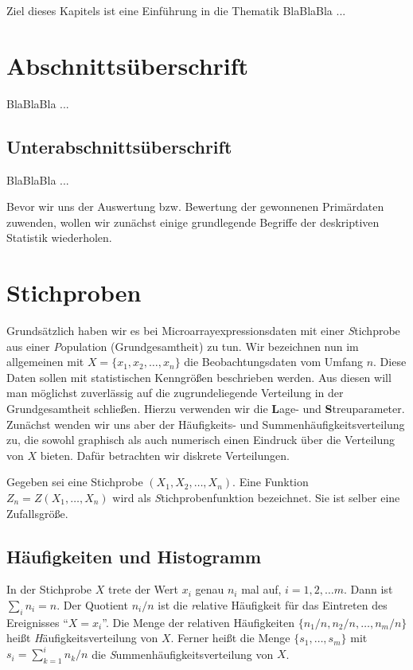
Ziel dieses Kapitels ist eine Einführung in die Thematik BlaBlaBla ...

\section{Abschnittsüberschrift}

BlaBlaBla ...

\subsection{Unterabschnittsüberschrift}

BlaBlaBla ...


Bevor wir uns der Auswertung bzw. Bewertung der gewonnenen Primärdaten zuwenden, wollen wir zunächst einige grundlegende Begriffe der deskriptiven Statistik wiederholen.
\section{Stichproben}

Grundsätzlich haben wir es bei Microarrayexpressionsdaten mit einer {\textit Stichprobe} aus einer {\textit Population (Grundgesamtheit)} zu tun.   
Wir bezeichnen nun im allgemeinen mit $X=\{x_1,x_2,\ldots,x_n\}$ die Beobachtungsdaten vom Umfang $n$. 
Diese Daten sollen mit statistischen Kenngrößen beschrieben werden. Aus diesen will man möglichst zuverlässig auf die zugrundeliegende Verteilung in der Grundgesamtheit schließen. Hierzu verwenden wir die {\textbf Lage-} und {\textbf Streuparameter}. Zunächst wenden wir uns aber der Häufigkeits- und Summenhäufigkeitsverteilung zu, die sowohl graphisch als auch numerisch einen Eindruck über die Verteilung von $X$ bieten. Dafür betrachten wir diskrete Verteilungen.

Gegeben sei eine Stichprobe $(X_1,X_2,\ldots,X_n)$. Eine Funktion $Z_n=Z(X_1,\ldots,X_n)$ wird als {\textit Stichprobenfunktion} bezeichnet. Sie ist selber eine Zufallsgröße.

\subsection{Häufigkeiten und Histogramm}
In der Stichprobe $X$ trete der Wert $x_i$ genau $n_i$ mal auf, $i=1,2,\ldots m$. Dann ist $\sum_i n_i = n$. Der Quotient $n_i/n$ ist die {\textit relative Häufigkeit} für das Eintreten des Ereignisses ``$X=x_i$''.
Die Menge der relativen Häufigkeiten $\{n_1/n,n_2/n,\ldots, n_m/n\}$ heißt {\textit Häufigkeitsverteilung} von $X$. Ferner heißt die Menge $\{s_1,\ldots,s_m\}$ mit $s_i=\sum_{k=1}^{i}n_k/n$ die {\textit Summenhäufigkeitsverteilung} von $X$.

